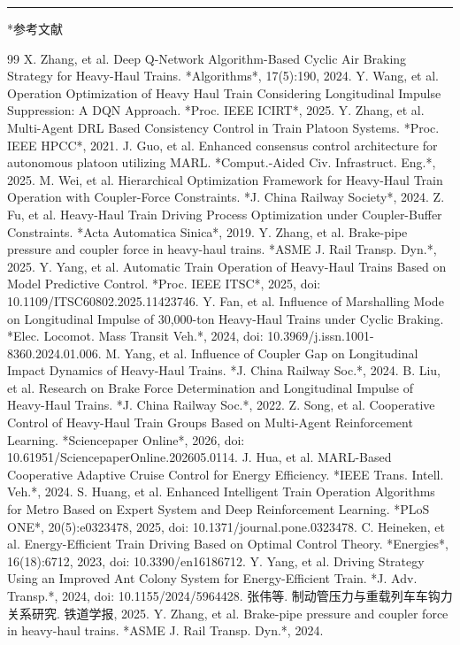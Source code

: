 \documentclass[11pt]{article}
\makeatletter
\renewcommand{\section}{\@startsection{section}{1}{\z@}{-3.5ex \@plus -1ex \@minus -.2ex}{2.3ex \@plus .2ex}{\normalfont\large\bfseries\sffamily}}
\makeatother
\begin{document}
\bigskip\hrule\bigskip


\section*{参考文献}


\begin{thebibliography}{99}
 X. Zhang, et al. Deep Q-Network Algorithm-Based Cyclic Air Braking Strategy for Heavy-Haul Trains. *Algorithms*, 17(5):190, 2024.
 Y. Wang, et al. Operation Optimization of Heavy Haul Train Considering Longitudinal Impulse Suppression: A DQN Approach. *Proc. IEEE ICIRT*, 2025.
 Y. Zhang, et al. Multi-Agent DRL Based Consistency Control in Train Platoon Systems. *Proc. IEEE HPCC*, 2021.
 J. Guo, et al. Enhanced consensus control architecture for autonomous platoon utilizing MARL. *Comput.-Aided Civ. Infrastruct. Eng.*, 2025.
 M. Wei, et al. Hierarchical Optimization Framework for Heavy-Haul Train Operation with Coupler-Force Constraints. *J. China Railway Society*, 2024.
 Z. Fu, et al. Heavy-Haul Train Driving Process Optimization under Coupler-Buffer Constraints. *Acta Automatica Sinica*, 2019.
 Y. Zhang, et al. Brake-pipe pressure and coupler force in heavy-haul trains. *ASME J. Rail Transp. Dyn.*, 2025.
 Y. Yang, et al. Automatic Train Operation of Heavy-Haul Trains Based on Model Predictive Control. *Proc. IEEE ITSC*, 2025, doi: 10.1109/ITSC60802.2025.11423746.
 Y. Fan, et al. Influence of Marshalling Mode on Longitudinal Impulse of 30,000-ton Heavy-Haul Trains under Cyclic Braking. *Elec. Locomot. Mass Transit Veh.*, 2024, doi: 10.3969/j.issn.1001-8360.2024.01.006.
 M. Yang, et al. Influence of Coupler Gap on Longitudinal Impact Dynamics of Heavy-Haul Trains. *J. China Railway Soc.*, 2024.
 B. Liu, et al. Research on Brake Force Determination and Longitudinal Impulse of Heavy-Haul Trains. *J. China Railway Soc.*, 2022.
 Z. Song, et al. Cooperative Control of Heavy-Haul Train Groups Based on Multi-Agent Reinforcement Learning. *Sciencepaper Online*, 2026, doi: 10.61951/SciencepaperOnline.202605.0114.
 J. Hua, et al. MARL-Based Cooperative Adaptive Cruise Control for Energy Efficiency. *IEEE Trans. Intell. Veh.*, 2024.
 S. Huang, et al. Enhanced Intelligent Train Operation Algorithms for Metro Based on Expert System and Deep Reinforcement Learning. *PLoS ONE*, 20(5):e0323478, 2025, doi: 10.1371/journal.pone.0323478.
 C. Heineken, et al. Energy-Efficient Train Driving Based on Optimal Control Theory. *Energies*, 16(18):6712, 2023, doi: 10.3390/en16186712.
 Y. Yang, et al. Driving Strategy Using an Improved Ant Colony System for Energy-Efficient Train. *J. Adv. Transp.*, 2024, doi: 10.1155/2024/5964428.
 张伟等. 制动管压力与重载列车车钩力关系研究. 铁道学报, 2025.
 Y. Zhang, et al. Brake-pipe pressure and coupler force in heavy-haul trains. *ASME J. Rail Transp. Dyn.*, 2024.
\end{thebibliography}
\end{document}
